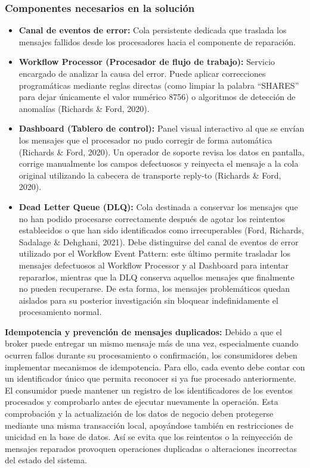 \documentclass[12pt, a4paper]{article}
\begin{document}
    \subsubsection{Componentes necesarios en la solución}
    \begin{itemize}
    \item \textbf{Canal de eventos de error:} Cola persistente dedicada que traslada los mensajes fallidos desde los procesadores hacia el componente de reparación.
    \item \textbf{Workflow Processor (Procesador de flujo de trabajo):} Servicio encargado de analizar la causa del error. Puede aplicar correcciones programáticas mediante reglas directas (como limpiar la palabra ``SHARES'' para dejar únicamente el valor numérico 8756) o algoritmos de detección de anomalías (Richards \& Ford, 2020).
    \item \textbf{Dashboard (Tablero de control):} Panel visual interactivo al que se envían los mensajes que el procesador no pudo corregir de forma automática (Richards \& Ford, 2020). Un operador de soporte revisa los datos en pantalla, corrige manualmente los campos defectuosos y reinyecta el mensaje a la cola original utilizando la cabecera de transporte reply-to (Richards \& Ford, 2020).
    \item \textbf{Dead Letter Queue (DLQ):} Cola destinada a conservar los mensajes que no han podido procesarse correctamente después de agotar los reintentos establecidos o que han sido identificados como irrecuperables (Ford, Richards, Sadalage \& Dehghani, 2021). Debe distinguirse del canal de eventos de error utilizado por el Workflow Event Pattern: este último permite trasladar los mensajes defectuosos al Workflow Processor y al Dashboard para intentar repararlos, mientras que la DLQ conserva aquellos mensajes que finalmente no pueden recuperarse. De esta forma, los mensajes problemáticos quedan aislados para su posterior investigación sin bloquear indefinidamente el procesamiento normal.
    \end{itemize}
    
    \textbf{Idempotencia y prevención de mensajes duplicados:} Debido a que el broker puede entregar un mismo mensaje más de una vez, especialmente cuando ocurren fallos durante su procesamiento o confirmación, los consumidores deben implementar mecanismos de idempotencia. Para ello, cada evento debe contar con un identificador único que permita reconocer si ya fue procesado anteriormente. El consumidor puede mantener un registro de los identificadores de los eventos procesados y comprobarlo antes de ejecutar nuevamente la operación. Esta comprobación y la actualización de los datos de negocio deben protegerse mediante una misma transacción local, apoyándose también en restricciones de unicidad en la base de datos. Así se evita que los reintentos o la reinyección de mensajes reparados provoquen operaciones duplicadas o alteraciones incorrectas del estado del sistema.
\end{document}
